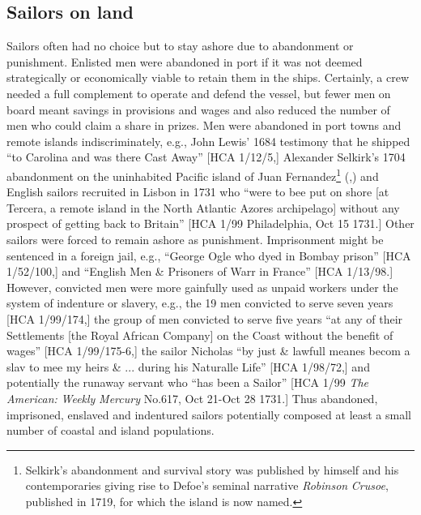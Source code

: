 \subsection{\textbf{Sailors} \textbf{on} \textbf{land}}%

Sailors often had no choice but to stay ashore due to abandonment or punishment. Enlisted men were abandoned in port if it was not deemed strategically or economically viable to retain them in the ships. Certainly, a crew needed a full complement to operate and defend the vessel, but fewer men on board meant savings in provisions and wages and also reduced the number of men who could claim a share in prizes. Men were abandoned in port towns and remote islands indiscriminately, e.g., John Lewis’ 1684 testimony that he shipped “to Carolina and was there Cast Away” [HCA 1/12/5,] Alexander Selkirk’s 1704 abandonment on the uninhabited Pacific island of Juan Fernandez\footnote{Selkirk’s abandonment and survival story was published by himself and his contemporaries giving rise to Defoe’s seminal narrative \textit{Robinson} \textit{Crusoe}, published in 1719, for which the island is now named.}  (\citealt{Souhami2013},) and English sailors recruited in Lisbon in 1731 who “were to bee put on shore [at Tercera, a remote island in the North Atlantic Azores archipelago] without any prospect of getting back to Britain” [HCA 1/99 Philadelphia, Oct 15 1731.] Other sailors were forced to remain ashore as punishment. Imprisonment might be sentenced in a foreign jail, e.g., “George Ogle who dyed in Bombay prison” [HCA 1/52/100,] and “English Men \& Prisoners of Warr in France” [HCA 1/13/98.] However, convicted men were more gainfully used as unpaid workers under the system of indenture or slavery, e.g., the 19 men convicted to serve seven years [HCA 1/99/174,] the group of men convicted to serve five years “at any of their Settlements [the Royal African Company] on the Coast without the benefit of wages” [HCA 1/99/175-6,] the sailor Nicholas “by just \& lawfull meanes becom a slav to mee my heirs \& ... during his Naturalle Life” [HCA 1/98/72,] and potentially the runaway servant who “has been a Sailor” [HCA 1/99 \textit{The} \textit{American:} \textit{Weekly} \textit{Mercury} No.617, Oct 21-Oct 28 1731.] Thus abandoned, imprisoned, enslaved and indentured sailors potentially composed at least a small number of coastal and island populations. 

